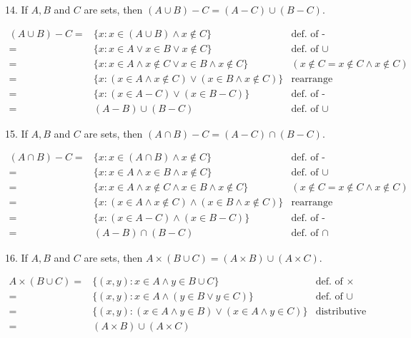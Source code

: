 \documentclass{idrisMemo}
\newcommand{\set}[1]{\{#1\}}
\begin{document}
\begin{prooflist}{14. If $A, B$ and $C$ are sets, then $(A \cup B)-C=(A-C) \cup(B-C)$.}
\item
\begin{align*}
    (A\cup B) - C =& \set{x: x\in (A\cup B) \land x\notin C} & \text{def. of -}\\
    =& \set{x: x\in A \lor x \in B \lor x\notin C} & \text{def. of $\cup$}\\
    =& \set{x: x\in A \land x\notin C \lor x\in B \land x\notin C} & (x\notin C = x\notin C \land x \notin C) \\
    =& \set{x: (x\in A \land x\notin C) \lor (x\in B \land x\notin C)} & \text{rearrange}\\
    =& \set{x: (x\in A  - C) \lor (x\in B - C)} & \text{def. of -}\\
    =& (A - B) \cup (B-C) & \text{def. of }\cup
\end{align*}
\end{prooflist}

\begin{prooflist}{15. If $A, B$ and $C$ are sets, then $(A \cap B)-C=(A-C) \cap(B-C)$.}
\item
\begin{align*}
    (A\cap B) - C =& \set{x: x\in (A\cap B) \land x\notin C} & \text{def. of -}\\
    =& \set{x: x\in A \land x \in B \land x\notin C} & \text{def. of $\cup$}\\
    =& \set{x: x\in A \land x\notin C \land x\in B \land x\notin C} & (x\notin C = x\notin C \land x \notin C) \\
    =& \set{x: (x\in A \land x\notin C) \land (x\in B \land x\notin C)} & \text{rearrange}\\
    =& \set{x: (x\in A  - C) \land (x\in B - C)} & \text{def. of -}\\
    =& (A - B) \cap (B-C) & \text{def. of }\cap
\end{align*}
\end{prooflist}

\begin{prooflist}{16. If $A, B$ and $C$ are sets, then $A \times(B \cup C)=(A \times B) \cup(A \times C)$.}
\item
\begin{align*}
    A\times (B\cup C) =& \set{(x, y): x\in A \land y\in B\cup C} & \text{def. of }\times\\
    =& \set{(x,y): x\in A \land (y \in B \lor y\in C)} & \text{def. of $\cup$}\\
    =& \set{(x,y): (x\in A \land y \in B) \lor (x\in A \land y\in C)} &
    \text{distributive law}\\
    =& (A\times B) \cup (A\times C)
\end{align*}
\end{prooflist}
\end{document}
